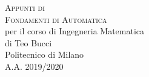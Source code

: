 \documentclass[10pt,a4paper,twoside]{book}
\begin{document}
\frontmatter

\pagestyle{empty}


\hypertarget{mytitlepage}{} %

\vspace*{\fill}

\begin{center}
	{\large \textsc{Appunti di}}\\
	\vspace*{0.4cm}
	{\Huge \textsc{Fondamenti di Automatica}}\\
	\vspace*{1cm}
	{\large per il corso di Ingegneria Matematica}\\
	\vspace*{0.4cm}
	{\large {di Teo Bucci}}\\
	\vspace*{1cm}
	Politecnico di Milano\\
	A.A. 2019/2020
\end{center}
\vspace*{\fill}
\clearpage


\hypertarget{mycopyright}{} %

\clearpage


% 


\cleardoublepage
\pagestyle{toc}
\hypertarget{mytoc}{} %
\bookmark[dest=mytoc,level=chapter]{\contentsname} %
\tableofcontents
\cleardoublepage


\pagestyle{fancy}
\mainmatter

 \cleardoublepage
\end{document}
